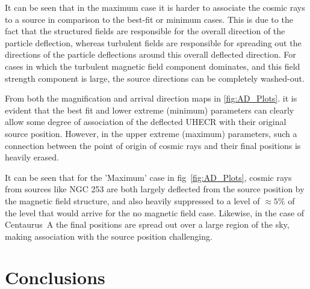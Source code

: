 \documentclass[usenatbib]{mnras}
\newcommand{\Arjen}[1]{{\color{brown}#1}}
\newcommand{\Vasu}[1]{{\color{purple}#1}}
\begin{document}
    It can be seen that in the maximum case it is harder to associate the cosmic rays to a source in comparison to the best-fit or minimum cases. This is due to the fact that the structured fields are responsible for the overall direction of the particle deflection, whereas turbulent fields are responsible for spreading out the directions of the particle deflections around this overall deflected direction. For cases in which the turbulent magnetic field component dominates, and this field strength component is large, the source directions can be completely washed-out.
   
    
From both the magnification and arrival direction maps in \ref{fig:AD_Plots}. it is evident that the best fit and lower extreme (minimum) parameters can clearly allow some degree of association of the deflected UHECR with their  original source position. However, in the upper extreme (maximum) parameters, such a connection between the point of origin of cosmic rays and their final positions is heavily erased. 


It can be seen that for the 'Maximum' case in fig~\ref{fig:AD_Plots}, cosmic rays from sources like NGC 253 are both largely deflected from the source position by the magnetic field structure, and also heavily suppressed to a level of $\approx 5\%$ of the level that would arrive for the no magnetic field case. Likewise, in the case of Centaurus~A the final positions are spread out over a large region of the sky, making association with the source position challenging.

\section{Conclusions}
\label{Conclusions}
\end{document}

